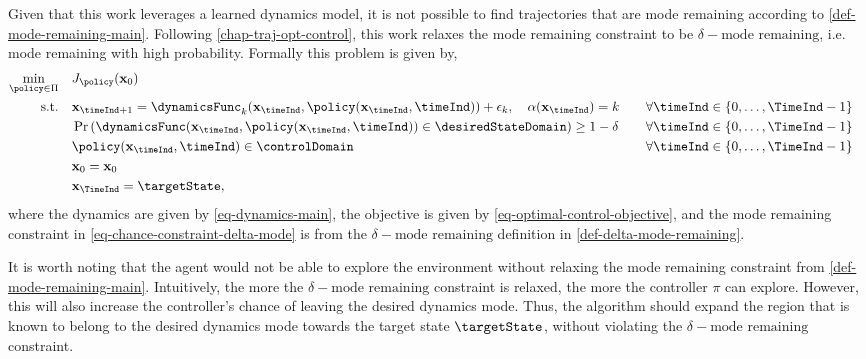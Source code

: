 \documentclass{mimosis-class/mimosis}
\numberwithin{equation}{chapter}
\newcommand{\modeInd}{\ensuremath{k}}
\newcommand{\mode}[1]{\ensuremath{#1_{\modeInd}}}
\newcommand{\state}{\ensuremath{\mathbf{x}}}
\newcommand{\modeVar}{\ensuremath{\alpha}}
\begin{document}
{Given that this work leverages a learned dynamics model, it is not
possible to find trajectories that are mode remaining according to \cref{def-mode-remaining-main}.
Following \cref{chap-traj-opt-control}, this work relaxes the mode remaining constraint
to be \(\delta-\text{mode remaining}\), i.e. mode remaining with high probability.
Formally this problem is given by,
\begin{subequations} \label{eq-mode-explore-problem}
\begin{align}
\min_{\policy \in \Pi} \quad &J_{\policy}(\state_0) \\
\text{s.t.} \quad &\state_{\timeInd+1} = \mode{\dynamicsFunc}(\state_\timeInd, \policy(\state_\timeInd, \timeInd)) + \mode{\epsilon},
\quad \modeVar(\state_{\timeInd}) = \modeInd \quad &&\forall \timeInd \in \{0, \ldots, \TimeInd-1\} \\
&\Pr \left(\dynamicsFunc(\state_{\timeInd}, \policy(\state_{\timeInd}, \timeInd)) \in \desiredStateDomain \right) \geq 1-\delta
&&\forall \timeInd \in \{0, \ldots, \TimeInd-1 \}
\label{eq-chance-constraint-delta-mode} \\
&\policy(\state_{\timeInd}, \timeInd) \in \controlDomain  \quad &&\forall \timeInd \in \{0, \ldots, \TimeInd-1\} \\
&\state_{0} = \state_0 \\
&\state_\TimeInd = \targetState,
\end{align}
\end{subequations}
where the dynamics are given by \cref{eq-dynamics-main}, the objective is given by \cref{eq-optimal-control-objective},
and the mode remaining constraint in \cref{eq-chance-constraint-delta-mode} is from the \(\delta-\text{mode remaining}\)
definition in \cref{def-delta-mode-remaining}.

It is worth noting that the agent would not be able to explore the environment without relaxing the
mode remaining constraint from \cref{def-mode-remaining-main}.
Intuitively, the more the \(\delta-\text{mode remaining}\) constraint is relaxed, the more the
controller \(\pi\) can explore.
However, this will also increase the controller's chance of leaving the desired dynamics mode.
Thus, the algorithm should expand the region that is known to belong to the desired dynamics mode
towards the target state \(\targetState\), without violating the \(\delta-\text{mode remaining}\) constraint.


}
\end{document}
